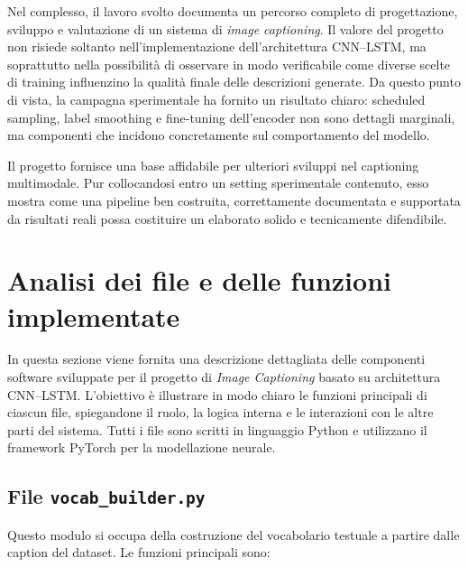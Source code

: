 \documentclass[11pt,a4paper]{report}
\begin{document}
Nel complesso, il lavoro svolto documenta un percorso completo di progettazione, sviluppo e valutazione di un sistema di \emph{image captioning}. Il valore del progetto non risiede soltanto nell'implementazione dell'architettura CNN--LSTM, ma soprattutto nella possibilità di osservare in modo verificabile come diverse scelte di training influenzino la qualità finale delle descrizioni generate. Da questo punto di vista, la campagna sperimentale ha fornito un risultato chiaro: scheduled sampling, label smoothing e fine-tuning dell'encoder non sono dettagli marginali, ma componenti che incidono concretamente sul comportamento del modello.

\begin{tcolorbox}[title=Considerazione finale]
Il progetto fornisce una base affidabile per ulteriori sviluppi nel captioning multimodale. Pur collocandosi entro un setting sperimentale contenuto, esso mostra come una pipeline ben costruita, correttamente documentata e supportata da risultati reali possa costituire un elaborato solido e tecnicamente difendibile.
\end{tcolorbox}

\chapter{Analisi dei file e delle funzioni implementate}

In questa sezione viene fornita una descrizione dettagliata delle componenti software sviluppate per il progetto di \emph{Image Captioning} basato su architettura CNN--LSTM.  
L'obiettivo è illustrare in modo chiaro le funzioni principali di ciascun file, spiegandone il ruolo, la logica interna e le interazioni con le altre parti del sistema.  
Tutti i file sono scritti in linguaggio Python e utilizzano il framework PyTorch per la modellazione neurale.

\section{File \texttt{vocab\_builder.py}}

Questo modulo si occupa della costruzione del vocabolario testuale a partire dalle caption del dataset.  
Le funzioni principali sono:
\end{document}
